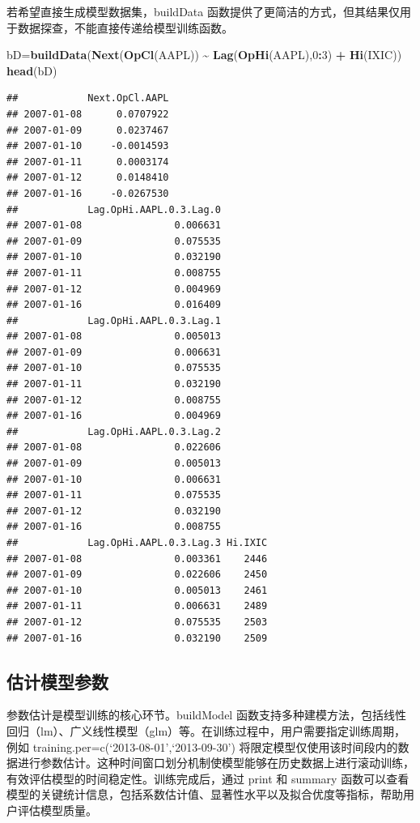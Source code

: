 \documentclass[]{ctexbook}
\newenvironment{Shaded}{\begin{snugshade}}{\end{snugshade}}
\newcommand{\DecValTok}[1]{\textcolor[rgb]{0.00,0.00,0.81}{#1}}
\newcommand{\FunctionTok}[1]{\textcolor[rgb]{0.13,0.29,0.53}{\textbf{#1}}}
\newcommand{\NormalTok}[1]{#1}
\newcommand{\OtherTok}[1]{\textcolor[rgb]{0.56,0.35,0.01}{#1}}
\newcommand{\SpecialCharTok}[1]{\textcolor[rgb]{0.81,0.36,0.00}{\textbf{#1}}}
\begin{document}
若希望直接生成模型数据集，buildData 函数提供了更简洁的方式，但其结果仅用于数据探查，不能直接传递给模型训练函数。

\begin{Shaded}
\begin{Highlighting}[]
\NormalTok{bD}\OtherTok{=}\FunctionTok{buildData}\NormalTok{(}\FunctionTok{Next}\NormalTok{(}\FunctionTok{OpCl}\NormalTok{(AAPL)) }\SpecialCharTok{\textasciitilde{}} \FunctionTok{Lag}\NormalTok{(}\FunctionTok{OpHi}\NormalTok{(AAPL),}\DecValTok{0}\SpecialCharTok{:}\DecValTok{3}\NormalTok{) }\SpecialCharTok{+} \FunctionTok{Hi}\NormalTok{(IXIC))}
\FunctionTok{head}\NormalTok{(bD)}
\end{Highlighting}
\end{Shaded}

\begin{verbatim}
##            Next.OpCl.AAPL
## 2007-01-08      0.0707922
## 2007-01-09      0.0237467
## 2007-01-10     -0.0014593
## 2007-01-11      0.0003174
## 2007-01-12      0.0148410
## 2007-01-16     -0.0267530
##            Lag.OpHi.AAPL.0.3.Lag.0
## 2007-01-08                0.006631
## 2007-01-09                0.075535
## 2007-01-10                0.032190
## 2007-01-11                0.008755
## 2007-01-12                0.004969
## 2007-01-16                0.016409
##            Lag.OpHi.AAPL.0.3.Lag.1
## 2007-01-08                0.005013
## 2007-01-09                0.006631
## 2007-01-10                0.075535
## 2007-01-11                0.032190
## 2007-01-12                0.008755
## 2007-01-16                0.004969
##            Lag.OpHi.AAPL.0.3.Lag.2
## 2007-01-08                0.022606
## 2007-01-09                0.005013
## 2007-01-10                0.006631
## 2007-01-11                0.075535
## 2007-01-12                0.032190
## 2007-01-16                0.008755
##            Lag.OpHi.AAPL.0.3.Lag.3 Hi.IXIC
## 2007-01-08                0.003361    2446
## 2007-01-09                0.022606    2450
## 2007-01-10                0.005013    2461
## 2007-01-11                0.006631    2489
## 2007-01-12                0.075535    2503
## 2007-01-16                0.032190    2509
\end{verbatim}

\subsection{估计模型参数}\label{ux4f30ux8ba1ux6a21ux578bux53c2ux6570}

参数估计是模型训练的核心环节。buildModel 函数支持多种建模方法，包括线性回归（lm）、广义线性模型（glm）等。在训练过程中，用户需要指定训练周期，例如 training.per=c(`2013-08-01',`2013-09-30') 将限定模型仅使用该时间段内的数据进行参数估计。这种时间窗口划分机制使模型能够在历史数据上进行滚动训练，有效评估模型的时间稳定性。训练完成后，通过 print 和 summary 函数可以查看模型的关键统计信息，包括系数估计值、显著性水平以及拟合优度等指标，帮助用户评估模型质量。
\end{document}
